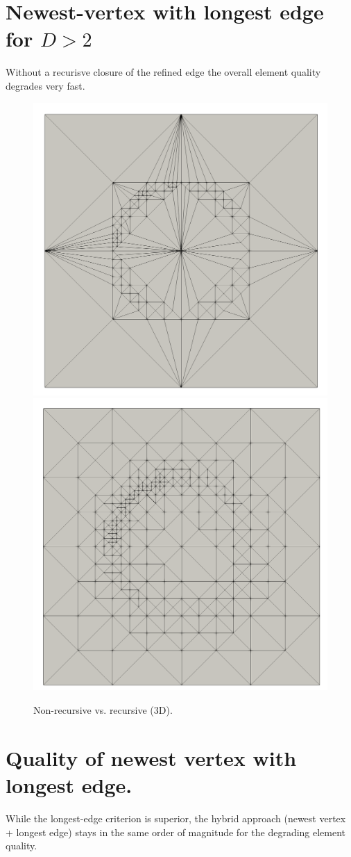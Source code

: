 \documentclass{article}
\begin{document}
\clearpage

\section{Newest-vertex with longest edge for $D>2$}

Without a recurisve closure of the refined edge the overall element quality degrades very fast.

\begin{figure}[htbp]
	\centering
	\includegraphics[width=0.48\linewidth]{figures/non-recursive} \hfill
	\includegraphics[width=0.48\linewidth]{figures/recursive}
	\caption{Non-recursive vs. recursive (3D).}
	\label{fig:metrics}
\end{figure}

\section{Quality of newest vertex with longest edge.}

While the longest-edge criterion is superior, the hybrid approach (newest vertex + longest edge) 
stays in the same order of magnitude for the degrading element quality.
\end{document}
